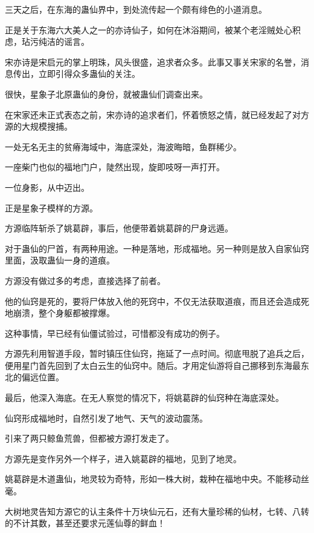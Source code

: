 
\begin{this_body}



三天之后，在东海的蛊仙界中，到处流传起一个颇有绯色的小道消息。

正是关于东海六大美人之一的亦诗仙子，如何在沐浴期间，被某个老淫贼处心积虑，玷污纯洁的谣言。

宋亦诗是宋启元的掌上明珠，风头很盛，追求者众多。此事又事关宋家的名誉，消息传出，立即引得众多蛊仙的关注。

很快，星象子北原蛊仙的身份，就被蛊仙们调查出来。

在宋家还未正式表态之前，宋亦诗的追求者们，怀着愤怒之情，就已经发起了对方源的大规模搜捕。

一处无名无主的贫瘠海域中，海底深处，海波晦暗，鱼群稀少。

一座柴门也似的福地门户，陡然出现，旋即吱呀一声打开。

一位身影，从中迈出。

正是星象子模样的方源。

方源临阵斩杀了姚葛辟，事后，他便带着姚葛辟的尸身远遁。

对于蛊仙的尸首，有两种用途。一种是落地，形成福地。另一种则是放入自家仙窍里面，汲取蛊仙一身的道痕。

方源没有做过多的考虑，直接选择了前者。

他的仙窍是死的，要将尸体放入他的死窍中，不仅无法获取道痕，而且还会造成死地崩溃，整个身躯都被撑爆。

这种事情，早已经有仙僵试验过，可惜都没有成功的例子。

方源先利用智道手段，暂时镇压住仙窍，拖延了一点时间。彻底甩脱了追兵之后，便用星门首先回到了太白云生的仙窍中。随后。才用定仙游将自己挪移到东海最东北的偏远位置。

最后，他深入海底。在无人察觉的情况下，将姚葛辟的仙窍种在海底深处。

仙窍形成福地时，自然引发了地气、天气的波动震荡。

引来了两只鲸鱼荒兽，但都被方源打发走了。

方源先是变作另外一个样子，进入姚葛辟的福地，见到了地灵。

姚葛辟是木道蛊仙，地灵较为奇特，形如一株大树，栽种在福地中央。不能移动丝毫。

大树地灵告知方源它的认主条件十万块仙元石，还有大量珍稀的仙材，七转、八转的不计其数，甚至还要求元莲仙尊的鲜血！


\end{this_body}
